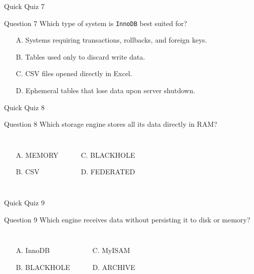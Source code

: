 \documentclass[aspectratio=169,11pt]{beamer}
\newcommand{\code}[1]{\texttt{#1}}
\newcommand{\smallitem}{\setlength{\itemsep}{2pt}}
\begin{document}
\begin{frame}{Quick Quiz 7}
\begin{block}{Question 7}
Which type of system is \code{InnoDB} best suited for?
\end{block}
\vspace{0.2cm}
\begin{itemize}\smallitem
  \item[A.] Systems requiring transactions, rollbacks, and foreign keys.
  \item[B.] Tables used only to discard write data.
  \item[C.] CSV files opened directly in Excel.
  \item[D.] Ephemeral tables that lose data upon server shutdown.
\end{itemize}
\end{frame}

\begin{frame}{Quick Quiz 8}
\begin{block}{Question 8}
Which storage engine stores all its data directly in RAM?
\end{block}
\vspace{0.2cm}
\begin{columns}[T,onlytextwidth]
\begin{itemize}\smallitem
  \item[A.] MEMORY
  \item[B.] CSV
\end{itemize}
\begin{itemize}\smallitem
  \item[C.] BLACKHOLE
  \item[D.] FEDERATED
\end{itemize}
\end{columns}
\end{frame}

\begin{frame}{Quick Quiz 9}
\begin{block}{Question 9}
Which engine receives data without persisting it to disk or memory?
\end{block}
\vspace{0.2cm}
\begin{columns}[T,onlytextwidth]
\begin{itemize}\smallitem
  \item[A.] InnoDB
  \item[B.] BLACKHOLE
\end{itemize}
\begin{itemize}\smallitem
  \item[C.] MyISAM
  \item[D.] ARCHIVE
\end{itemize}
\end{columns}
\end{frame}
\end{document}
